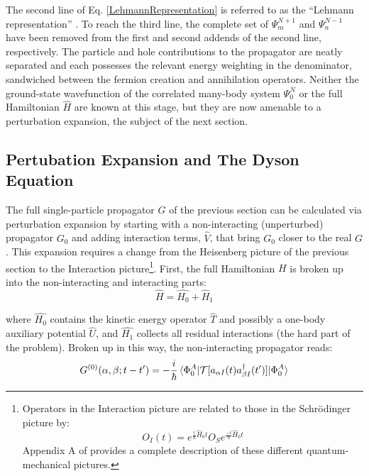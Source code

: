 The second line of Eq. \ref{LehmannRepresentation} is referred to as the ``Lehmann representation'' 
\cite{Lehmann1954}. To reach the third line, the complete set of
$\Psi^{N+1}_{m}$ and $\Psi^{N-1}_{n}$ have been removed from the first and second addends of the
second line, respectively.
The particle and hole contributions to the propagator are neatly separated and
each possesses the relevant energy weighting in the denominator, sandwiched between the fermion 
creation and annihilation operators. Neither the ground-state wavefunction of the correlated
many-body system $\Psi^{N}_{0}$ or the full Hamiltonian $\hat{H}$ are known at this stage, but they
are now amenable to a perturbation expansion, the subject of the next section.

\subsection{Pertubation Expansion and The Dyson Equation}
The full single-particle propagator $G$ of the previous section can be calculated via perturbation
expansion by starting with a non-interacting (unperturbed) propagator $G_{0}$ and adding interaction 
terms, $\hat{V}$, that bring $G_{0}$ closer to the real $G$. This expansion requires a change from
the Heisenberg picture of the previous section to the Interaction picture\footnote{Operators in the
    Interaction picture are related to those in the Schr\"odinger picture by:
    \begin{equation*}
        O_{I}(t) = e^{\frac{i}{\hbar}\hat{H}_{0}t}O_{S}e^{\frac{-i}{\hbar}\hat{H}_{0}t}
    \end{equation*}
    Appendix A of \cite{MBTE} provides a complete description of these different quantum-mechanical
pictures.}. First, the full Hamiltonian $H$ is broken up into the non-interacting and interacting
parts:
\begin{equation}
    \hat{H} = \hat{H_{0}}+\hat{H}_{1}
\end{equation}

\noindent
where $\hat{H_{0}}$ contains the kinetic energy operator $\hat{T}$ and possibly a one-body auxiliary
potential $\hat{U}$, and $\hat{H_{1}}$ collects all residual interactions (the hard part of the
problem). Broken up in this way, the non-interacting propagator reads:
\begin{equation}
    G^{(0)}(\alpha, \beta; t-t') =
    -\frac{i}{\hbar}\braket{\Phi^{A}_{0}|
    \mathcal{T}[a_{\alpha I}(t)a^{\dagger}_{\beta I}(t')]|\Phi^{A}_{0}}
\end{equation}

